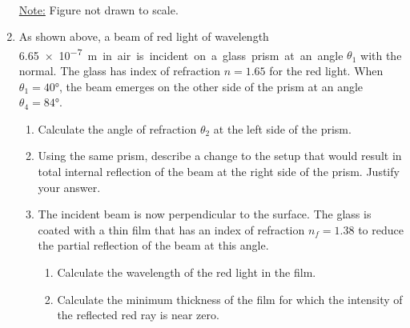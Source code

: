 \documentclass{../../../oss-apphys}
\begin{document}
\begin{enumerate}[leftmargin=15pt]
  \begin{center}
    \\
    \underline{Note:} Figure not drawn to scale.
  \end{center}
\item As shown above, a beam of red light of wavelength \SI{6.65e-7}\metre in
  air is incident on a glass prism at an angle $\theta_1$ with the normal. The
  glass has index of refraction $n=1.65$ for the red light. When
  $\theta_1=\ang{40}$, the beam emerges on the other side of the prism at an
  angle $\theta_4=\ang{84}$.
  \begin{enumerate}
  \item Calculate the angle of refraction $\theta_2$ at the left side of the
    prism.
  \item Using the same prism, describe a change to the setup that would result
    in total internal reflection of the beam at the right side of the prism.
    Justify your answer.
  \item The incident beam is now perpendicular to the surface. The glass is
    coated with a thin film that has an index of refraction $n_f = 1.38$ to
    reduce the partial reflection of the beam at this angle.
    \begin{enumerate}
    \item Calculate the wavelength of the red light in the film.
    \item Calculate the minimum thickness of the film for which the intensity
      of the reflected red ray is near zero.
    \end{enumerate}
  \end{enumerate}
  \newpage


\end{enumerate}
\end{document}
